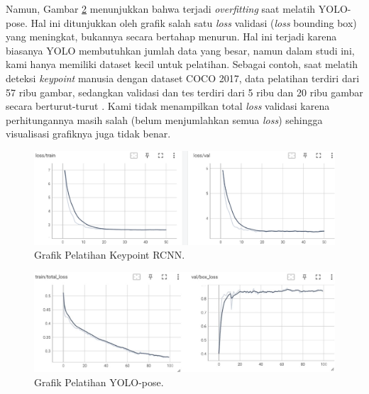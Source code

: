 Namun, Gambar \ref{fig:yolo-training-graphics} menunjukkan bahwa terjadi \textit{overfitting} saat melatih YOLO-pose. Hal ini ditunjukkan oleh grafik salah satu \textit{loss} validasi (\textit{loss} bounding box) yang meningkat, bukannya secara bertahap menurun. Hal ini terjadi karena biasanya YOLO membutuhkan jumlah data yang besar, namun dalam studi ini, kami hanya memiliki dataset kecil untuk pelatihan.
Sebagai contoh, saat melatih deteksi \textit{keypoint} manusia dengan dataset COCO 2017, data pelatihan terdiri dari 57 ribu gambar, sedangkan validasi dan tes terdiri dari 5 ribu dan 20 ribu gambar secara berturut-turut \parencite{maji2022yolopose}.
Kami tidak menampilkan total \textit{loss} validasi karena perhitungannya masih salah (belum menjumlahkan semua \textit{loss}) sehingga visualisasi grafiknya juga tidak benar.
\begin{figure}[ht]
  \centering
  \includegraphics[scale=0.65]{gambar/loss-rcnn.png}
  \caption{Grafik Pelatihan Keypoint RCNN.}
  \label{fig:rcnn-training-graphics}
\end{figure}
\begin{figure}[ht]
  \centering
  \includegraphics[scale=0.5]{gambar/loss-yolo.jpg}
  \caption{Grafik Pelatihan YOLO-pose.}
  \label{fig:yolo-training-graphics}
\end{figure}

